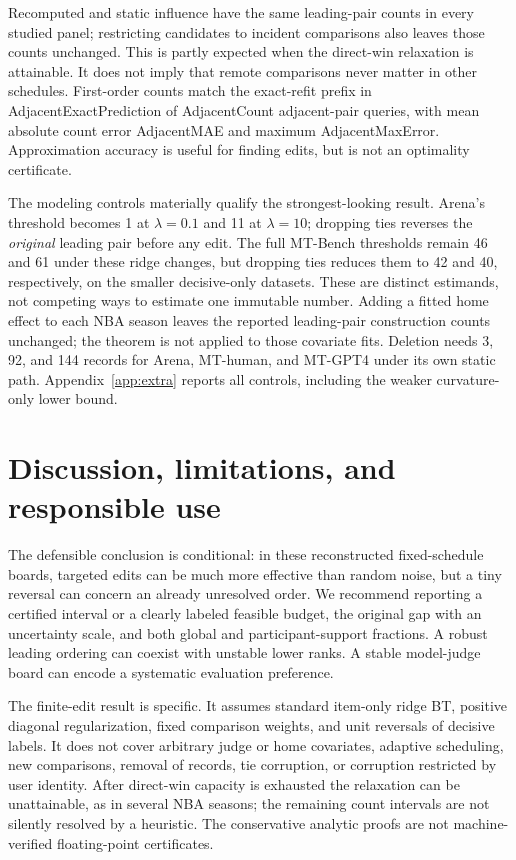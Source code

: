 \documentclass{article}
\newcommand{\num}[1]{\csname #1\endcsname}
\begin{document}
Recomputed and static influence have the same leading-pair counts in every studied panel; restricting candidates to incident comparisons also leaves those counts unchanged. This is partly expected when the direct-win relaxation is attainable. It does not imply that remote comparisons never matter in other schedules. First-order counts match the exact-refit prefix in \num{AdjacentExactPrediction} of \num{AdjacentCount} adjacent-pair queries, with mean absolute count error \num{AdjacentMAE} and maximum \num{AdjacentMaxError}. Approximation accuracy is useful for finding edits, but is not an optimality certificate.

The modeling controls materially qualify the strongest-looking result. Arena's threshold becomes 1 at $\lambda=0.1$ and 11 at $\lambda=10$; dropping ties reverses the \emph{original} leading pair before any edit. The full MT-Bench thresholds remain 46 and 61 under these ridge changes, but dropping ties reduces them to 42 and 40, respectively, on the smaller decisive-only datasets. These are distinct estimands, not competing ways to estimate one immutable number. Adding a fitted home effect to each NBA season leaves the reported leading-pair construction counts unchanged; the theorem is not applied to those covariate fits. Deletion needs 3, 92, and 144 records for Arena, MT-human, and MT-GPT4 under its own static path. Appendix~\ref{app:extra} reports all controls, including the weaker curvature-only lower bound.

\section{Discussion, limitations, and responsible use}
\label{sec:limitations}
The defensible conclusion is conditional: in these reconstructed fixed-schedule boards, targeted edits can be much more effective than random noise, but a tiny reversal can concern an already unresolved order. We recommend reporting a certified interval or a clearly labeled feasible budget, the original gap with an uncertainty scale, and both global and participant-support fractions. A robust leading ordering can coexist with unstable lower ranks. A stable model-judge board can encode a systematic evaluation preference.

The finite-edit result is specific. It assumes standard item-only ridge BT, positive diagonal regularization, fixed comparison weights, and unit reversals of decisive labels. It does not cover arbitrary judge or home covariates, adaptive scheduling, new comparisons, removal of records, tie corruption, or corruption restricted by user identity. After direct-win capacity is exhausted the relaxation can be unattainable, as in several NBA seasons; the remaining count intervals are not silently resolved by a heuristic. The conservative analytic proofs are not machine-verified floating-point certificates.
\end{document}
